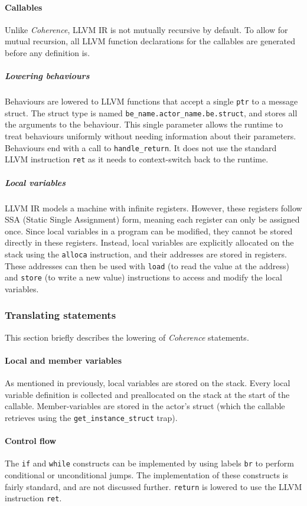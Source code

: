 \documentclass[a4paper,12pt,fleqn]{article}
\begin{document}
\paragraph{Callables\\}
Unlike \textit{Coherence}, LLVM IR is not mutually recursive by default. To allow for mutual recursion, all LLVM function declarations for the callables are generated before any definition is.
\subparagraph{Lowering behaviours\\}
Behaviours are lowered to LLVM functions that accept a single \texttt{ptr} to a message struct. The struct type is named \texttt{be\_name.actor\_name.be.struct}, and stores all the arguments to the behaviour. This single parameter allows the runtime to treat behaviours uniformly without needing information about their parameters. Behaviours end with a call to \texttt{handle\_return}. It does not use the standard LLVM instruction \texttt{ret} as it needs to context-switch back to the runtime.
\subparagraph{Local variables\\}
LLVM IR models a machine with infinite registers. However, these registers follow SSA (Static Single Assignment) form, meaning each register can only be assigned once. Since local variables in a program can be modified, they cannot be stored directly in these registers. Instead, local variables are explicitly allocated on the stack using the \texttt{alloca} instruction, and their addresses are stored in registers. These addresses can then be used with \texttt{load} (to read the value at the address) and \texttt{store} (to write a new value) instructions to access and modify the local variables.

\subsubsection{Translating statements}
This section briefly describes the lowering of \textit{Coherence} statements.
\paragraph{Local and member variables\\}
As mentioned in previously, local variables are stored on the stack. Every local variable definition is collected and preallocated on the stack at the start of the callable. Member-variables are stored in the actor's struct (which the callable retrieves using the \texttt{get\_instance\_struct} trap).
\paragraph{Control flow\\}
The \texttt{if} and \texttt{while} constructs can be implemented by using labels \texttt{br} to perform conditional or unconditional jumps. The implementation of these constructs is fairly standard, and are not discussed further. \texttt{return} is lowered to use the LLVM instruction \texttt{ret}.
\end{document}
